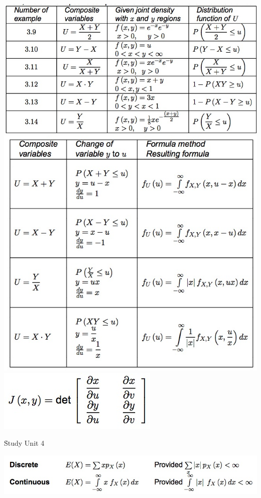 \documentclass{/out/app/latex/examnotes}
\begin{document}
{\includegraphics[scale=0.5]{./img/364.jpg}
\includegraphics[scale=0.5]{./img/365.jpg}
\includegraphics[scale=0.5]{./img/366.jpg}


\h{Study Unit 4}

\includegraphics[scale=0.5]{./img/41.jpg}

}
\end{document}
